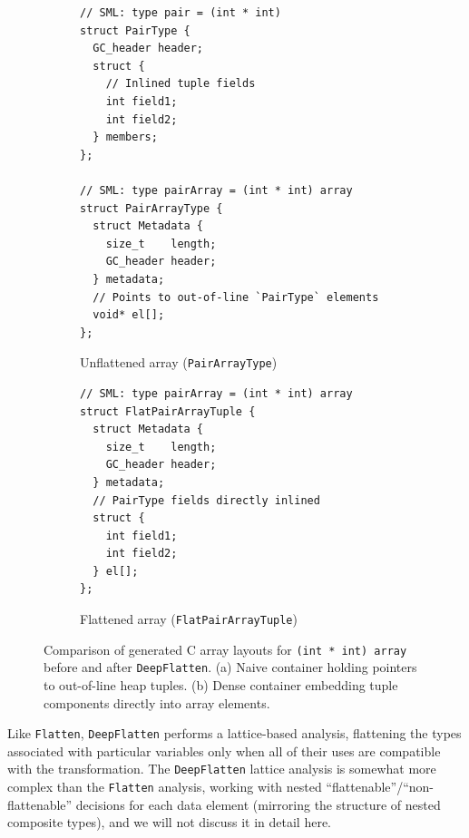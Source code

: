 \begin{figure}[htbp]
  \centering
  \begin{subfigure}[t]{0.48\textwidth}
    \caption{Unflattened array (\texttt{PairArrayType})}
    \label{fig:flatten_c_pair_array}
    \vspace{1mm}
\begin{verbatim}
// SML: type pair = (int * int)
struct PairType {
  GC_header header;
  struct {
    // Inlined tuple fields
    int field1;
    int field2;
  } members;
};

// SML: type pairArray = (int * int) array
struct PairArrayType {
  struct Metadata {
    size_t    length;
    GC_header header;
  } metadata;
  // Points to out-of-line `PairType` elements
  void* el[];
};
\end{verbatim}
  \end{subfigure}\hfill
  \begin{subfigure}[t]{0.48\textwidth}
    \caption{Flattened array (\texttt{FlatPairArrayTuple})}
    \label{fig:flatten_c_flat_pair_array}
    \vspace{1mm}
\begin{verbatim}
// SML: type pairArray = (int * int) array
struct FlatPairArrayTuple {
  struct Metadata {
    size_t    length;
    GC_header header;
  } metadata;
  // PairType fields directly inlined
  struct {
    int field1;
    int field2;
  } el[];
};
\end{verbatim}
  \end{subfigure}
  \caption{Comparison of generated C array layouts for \texttt{(int * int) array} before and after \texttt{DeepFlatten}. (a) Naive container holding pointers to out-of-line heap tuples. (b) Dense container embedding tuple components directly into array elements.}
  \label{fig:flatten_generated_c}
\end{figure}

Like \texttt{Flatten}, \texttt{DeepFlatten} performs a lattice-based analysis,
flattening the types associated with particular variables only when all of their
uses are compatible with the transformation. The \texttt{DeepFlatten} lattice
analysis is somewhat more complex than the \texttt{Flatten} analysis, working
with nested ``flattenable''/``non-flattenable'' decisions for each data element
(mirroring the structure of nested composite types), and we will not discuss it
in detail here.

